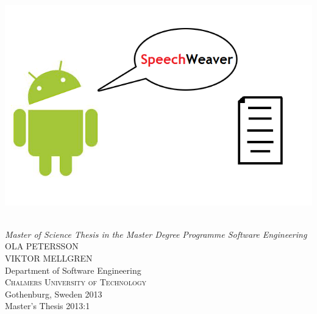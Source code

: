 \begin{titlepage}

\mbox{}
\vfill
\addtolength{\voffset}{2cm}

\includegraphics[width = 400pt, keepaspectratio = true]{fig/tempframsida3}

\begin{flushleft}
	{ \\[0.5cm]
	\emph{\Large Master of Science Thesis in the Master Degree Programme Software Engineering} \\[.8cm]
	
	{\huge OLA PETERSSON}\\[.8cm]
    {\huge VIKTOR MELLGREN}\\[.8cm]
	
    
	{\Large Department of Software Engineering \\
	\textsc{Chalmers University of Technology} \\
	Gothenburg, Sweden 2013 \\
	Master's Thesis 2013:1\\
	}
    }
\end{flushleft}

\end{titlepage}
\ClearShipoutPicture

\pagestyle{empty}
\clearpage 
\thispagestyle{empty}



\pagestyle{empty}
\clearpage 
\thispagestyle{empty}

